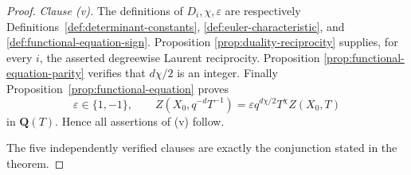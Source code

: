 \begin{proof}
\smallskip
\noindent\emph{Clause \textup{(v)}.}
The definitions of \(D_i,\chi,\varepsilon\) are respectively
Definitions~\ref{def:determinant-constants},
\ref{def:euler-characteristic},
and \ref{def:functional-equation-sign}.  Proposition
\ref{prop:duality-reciprocity} supplies, for every \(i\), the asserted
degreewise Laurent reciprocity.  Proposition
\ref{prop:functional-equation-parity} verifies that \(d\chi/2\) is an
integer.  Finally Proposition~\ref{prop:functional-equation} proves
\[
 \varepsilon\in\{1,-1\},\qquad
 Z(X_0,q^{-d}T^{-1})
 =\varepsilon q^{d\chi/2}T^\chi Z(X_0,T)
\]
in \(\mathbf Q(T)\).  Hence all assertions of \textup{(v)} follow.

The five independently verified clauses are exactly the conjunction stated
in the theorem.
\end{proof}
